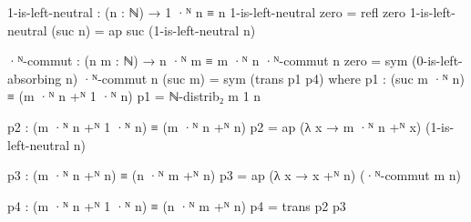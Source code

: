 \documentclass{article}[12pt]
\begin{document}
\begin{code}
1-is-left-neutral : (n : ℕ) → 1 ·ᴺ n ≡ n
1-is-left-neutral zero = refl zero
1-is-left-neutral (suc n) = ap suc (1-is-left-neutral n)

·ᴺ-commut : (n m : ℕ) → n ·ᴺ m ≡ m ·ᴺ n
·ᴺ-commut n zero = sym (0-is-left-absorbing n)
·ᴺ-commut n (suc m) = sym (trans p1 p4)
    where
        p1 : (suc m ·ᴺ n) ≡ (m ·ᴺ n +ᴺ 1 ·ᴺ n)
        p1 = ℕ-distrib₂ m 1 n

        p2 : (m ·ᴺ n +ᴺ 1 ·ᴺ n) ≡ (m ·ᴺ n +ᴺ n)
        p2 = ap (λ x → m ·ᴺ n +ᴺ x) (1-is-left-neutral n)

        p3 : (m ·ᴺ n +ᴺ n) ≡ (n ·ᴺ m +ᴺ n)
        p3 = ap (λ x → x +ᴺ n) (·ᴺ-commut m n)

        p4 : (m ·ᴺ n +ᴺ 1 ·ᴺ n) ≡ (n ·ᴺ m +ᴺ n)
        p4 = trans p2 p3
\end{code}
\end{document}

